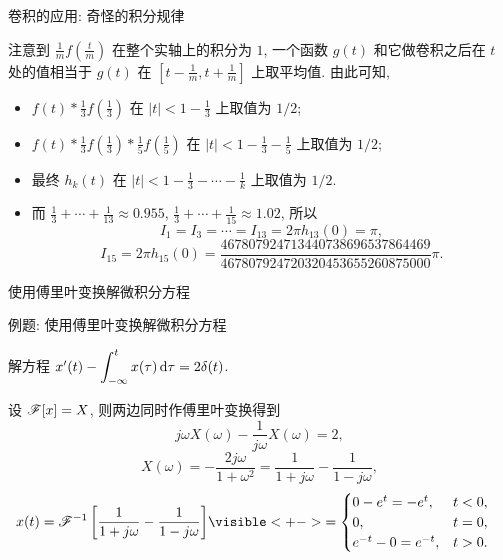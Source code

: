 \begin{frame}{卷积的应用: 奇怪的积分规律}
	\begin{solutionc}
		注意到 $\frac1mf(\frac tm)$ 在整个实轴上的积分为 $1$, 一个函数 $g(t)$ 和它做卷积之后在 $t$ 处的值相当于 $g(t)$ 在 $[t-\frac1m,t+\frac1m]$ 上取平均值.
		由此可知, 
		\begin{itemize}
			\item $f(t)\ast \frac13f(\frac13)$ 在 $|t|<1-\frac13$ 上取值为 $1/2$;
			\item $f(t)\ast \frac13f(\frac13)\ast \frac15f(\frac15)$ 在 $|t|<1-\frac13-\frac15$ 上取值为 $1/2$;
			\item 最终 $h_k(t)$ 在 $|t|<1-\frac13-\cdots-\frac1k$ 上取值为 $1/2$.
			\item 而 $\frac13+\cdots+\frac1{13}\approx 0.955$, $\frac13+\cdots+\frac1{15}\approx 1.02$, 所以
			\[I_1=I_3=\cdots=I_{13}=2\pi h_{13}(0)=\pi,\]
			\[I_{15}=2\pi h_{15}(0)=\frac{467 807 924 713 440 738 696 537 864 469}{467 807 924 720 320 453 655 260 875 000}\pi.\]
		\end{itemize}
	\end{solutionc}
\end{frame}


\begin{frame}{使用傅里叶变换解微积分方程}
\begin{center}
\end{center}
\end{frame}


\begin{frame}{例题: 使用傅里叶变换解微积分方程}
\beqskip{0pt}
\begin{example}
解方程 $x'(t)-\displaystyle\int_{-\infty}^t x(\tau)\,\mathrm{d} \tau=2\delta(t)$.
\end{example}
\begin{solution}
设 $\mathscr{F}[x]=X$, 则两边同时作傅里叶变换得到
\onslide<+->
\[j\omega X(\omega)-\frac1{j\omega}X(\omega)=2,\]
\onslide<+->
\[X(\omega)=-\frac{2j\omega}{1+\omega^2}=\frac1{1+j\omega}-\frac1{1-j\omega},\]
\onslide<+->
\begin{align*}
x(t)=\msf^{-1}\left[\frac1{1+j\omega}-\frac1{1-j\omega}\right]
&\visible<+->{=\begin{cases}
0-e^t=-e^t,&t<0,\\
0,&t=0,\\
e^{-t}-0=e^{-t},&t>0.
\end{cases}}
\end{align*}
\end{solution}
\vspace{-1pt}
\endgroup
\end{frame}


